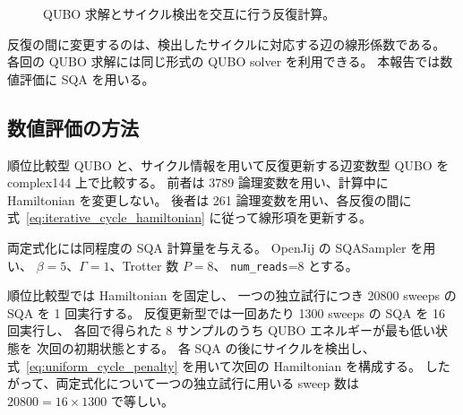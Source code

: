 \documentclass[a4j,10pt]{ujarticle}
\begin{document}
\begin{figure}[htbp]
\centering
{}
\caption{QUBO 求解とサイクル検出を交互に行う反復計算。}
\label{fig:iterative_cycle_feedback}
\end{figure}

反復の間に変更するのは、検出したサイクルに対応する辺の線形係数である。
各回の QUBO 求解には同じ形式の QUBO solver を利用できる。
本報告では数値評価に SQA を用いる。

\subsection{数値評価の方法}

順位比較型 QUBO と、サイクル情報を用いて反復更新する辺変数型 QUBO を
complex144 上で比較する。
前者は 3789 論理変数を用い、計算中に Hamiltonian を変更しない。
後者は 261 論理変数を用い、各反復の間に
式~\eqref{eq:iterative_cycle_hamiltonian} に従って線形項を更新する。

両定式化には同程度の SQA 計算量を与える。
OpenJij の SQASampler を用い、
$\beta=5$、$\Gamma=1$、Trotter 数 $P=8$、
\texttt{num\_reads}=8 とする。

順位比較型では Hamiltonian を固定し、
一つの独立試行につき 20800 sweeps の SQA を 1 回実行する。
反復更新型では一回あたり 1300 sweeps の SQA を 16 回実行し、
各回で得られた 8 サンプルのうち QUBO エネルギーが最も低い状態を
次回の初期状態とする。
各 SQA の後にサイクルを検出し、
式~\eqref{eq:uniform_cycle_penalty} を用いて次回の Hamiltonian を構成する。
したがって、両定式化について一つの独立試行に用いる sweep 数は
$20800=16\times1300$ で等しい。
\end{document}
